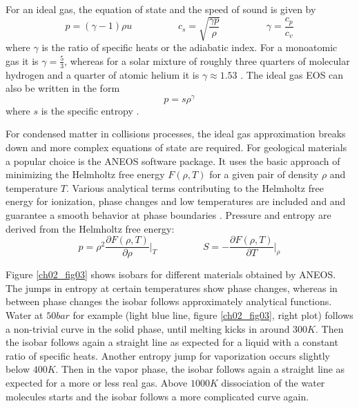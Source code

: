 For an ideal gas, the equation of state and the speed of sound is given by
\begin{equation}
\label{ch02_sph01_eq036}
p = ( \gamma - 1 ) \rho u \hspace{2cm} c_s = \sqrt{ \frac{\gamma p}{\rho} } \hspace{2cm} \gamma = \frac{c_p}{c_v}
\end{equation}
where $\gamma$ is the ratio of specific heats or the adiabatic index. For a monoatomic gas it is $\gamma = \frac{5}{3}$, whereas for a solar mixture of roughly three quarters of molecular hydrogen and a quarter of atomic helium it is $\gamma \approx 1.53$ \citep{Nelson:2000p75}. The ideal gas EOS can also be written in the form 
\begin{equation}
p = s \rho^{\gamma}
\end{equation}
where $s$ is the specific entropy \citep{Springel:2005p51}.

For condensed matter in collisions processes, the ideal gas approximation breaks down and more complex equations of state are required. For geological materials a popular choice is the ANEOS software package. It uses the basic approach of minimizing the Helmholtz free energy $F(\rho, T)$ for a given pair of density $\rho$ and temperature $T$. Various analytical terms contributing to the Helmholtz free energy for ionization, phase changes and low temperatures are included and and guarantee a smooth behavior at phase boundaries \citep{Thompson:1990p1103}. Pressure and entropy are derived from the Helmholtz free energy:
\begin{equation}
\label{ch02_sph01_eq037}
p = \rho^2 \frac{\partial F(\rho, T)}{\partial \rho} \Big|_{T} \hspace{2cm} S = - \frac{\partial F(\rho, T)}{\partial T} \Big|_{\rho}
\end{equation}

Figure \ref{ch02_fig03} shows isobars for different materials obtained by ANEOS. The jumps in entropy at certain temperatures show phase changes, whereas in between phase changes the isobar follows approximately analytical functions. Water at $50bar$ for example (light blue line, figure \ref{ch02_fig03}, right plot) follows a non-trivial curve in the solid phase, until melting kicks in around $300K$. Then the isobar follows again a straight line as expected for a liquid with a constant ratio of specific heats. Another entropy jump for vaporization occurs slightly below $400K$. Then in the vapor phase, the isobar follows again a straight line as expected for a more or less real gas. Above $1000K$ dissociation of the water molecules starts and the isobar follows a more complicated curve again.

